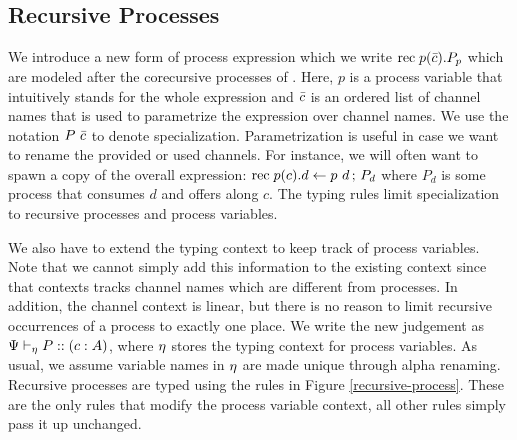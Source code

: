 \documentclass[a4paper,USenglish]{lipics-v2016}
\begin{document}
\subsection{Recursive Processes}

We introduce a new form of process expression which we write $\mathrm{rec}\; {p}(\bar{c}) . {P}_p$ which are modeled after the corecursive processes of \cite{Toninho14}. Here, $p$ is a process variable that intuitively stands for the whole expression and $\bar{c}$ is an ordered list of channel names that is used to parametrize the expression over channel names. We use the notation ${P}~{\bar{c}}$ to denote specialization. Parametrization is useful in case we want to rename the provided or used channels. For instance, we will often want to spawn a copy of the overall expression: $\mathrm{rec}\; {p}(c) . {d \leftarrow {p}~{d} \,;\, P_d}$ where $P_d$ is some process that consumes $d$ and offers along $c$. The typing rules limit specialization to recursive processes and process variables.

We also have to extend the typing context to keep track of process variables. Note that we cannot simply add this information to the existing context since that contexts tracks channel names which are different from processes. In addition, the channel context is linear, but there is no reason to limit recursive occurrences of a process to exactly one place. We write the new judgement as ${\Psi} \vdash_{\eta} P :: (c : A)$, where $\eta$ stores the typing context for process variables. As usual, we assume variable names in $\eta$ are made unique through alpha renaming. Recursive processes are typed using the rules in Figure \ref{recursive-process}. These are the only rules that modify the process variable context, all other rules simply pass it up unchanged.

\end{document}
